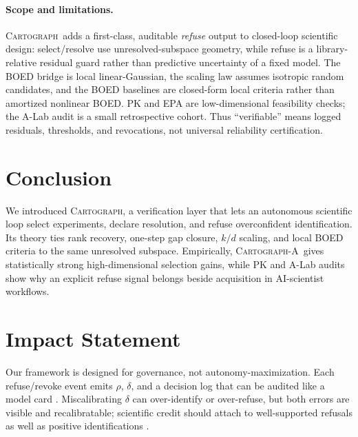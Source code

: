 \documentclass{article}
\newcommand{\method}{\textsc{Cartograph}}
\newcommand{\uopt}{\textsc{Cartograph-A}}
\theoremstyle{plain}
\theoremstyle{definition}
\theoremstyle{remark}
\begin{document}
\paragraph{Scope and limitations.}
\method\ adds a first-class, auditable \emph{refuse} output to closed-loop
scientific design: select/resolve use unresolved-subspace geometry, while
refuse is a library-relative residual guard rather than predictive
uncertainty of a fixed model. The BOED bridge is local linear-Gaussian, the
scaling law assumes isotropic random candidates, and the BOED baselines are
closed-form local criteria rather than amortized nonlinear BOED. PK and EPA
are low-dimensional feasibility checks; the A-Lab audit is a small
retrospective cohort. Thus ``verifiable'' means logged residuals,
thresholds, and revocations, not universal reliability certification.

\section{Conclusion}

We introduced \method, a verification layer that lets an autonomous
scientific loop select experiments, declare resolution, and refuse
overconfident identification. Its theory ties rank recovery, one-step
gap closure, $k/d$ scaling, and local BOED criteria to the same unresolved
subspace. Empirically, \uopt\ gives statistically strong high-dimensional
selection gains, while PK and A-Lab audits show why an explicit refuse
signal belongs beside acquisition in AI-scientist workflows.

\section*{Impact Statement}

Our framework is designed for governance, not autonomy-maximization. Each
refuse/revoke event emits $\rho$, $\delta$, and a decision log that can be
audited like a model card \citep{mitchell2019modelcards}. Miscalibrating
$\delta$ can over-identify or over-refuse, but both errors are visible and
recalibratable; scientific credit should attach to well-supported refusals
as well as positive identifications \citep{amodei2016concrete,weidinger2021ethics}.
\end{document}
